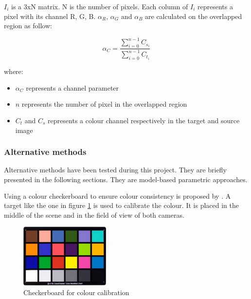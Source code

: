 $I_i$ is a 3xN matrix. N is the number of pixels. Each column of $I_i$ represents a pixel with its channel R, G, B.  $\alpha_{R}$, $\alpha_{G}$ and $\alpha_{B}$ are calculated on the overlapped region as follow:

\begin{equation}
    \alpha_{C} = \dfrac{\sum_{i=0}^{n-1} C_{s_{i}}}{\sum_{i=0}^{n-1} C_{t_{i}}}
    \label{equation:param}
\end{equation}

where:

\begin{itemize}
    \item $\alpha_{C}$ represents a channel parameter
    \item $n$ represents the number of pixel in the overlapped region
    \item $C_{t}$ and $C_{s}$ represents a colour channel respectively in the target and source image 
\end{itemize}

\subsubsection{Alternative methods}

Alternative methods have been tested during this project. They are briefly presented in the following sections. They are model-based parametric approaches.

\label{section:ensuring_checkerboard}

Using a colour checkerboard to ensure colour consistency is proposed by \cite{ilie_ensuring_2005}. A target like the one in figure \ref{figure:colour_checkerboard} is used to calibrate the colour. It is placed in the middle of the scene and in the field of view of both cameras.

\begin{figure}[H]
    \centering
    \includegraphics[width=0.40\textwidth]{images/visual_enhancement/colour/colour_checkerboard.jpg}
    \caption{Checkerboard for colour calibration}
    \label{figure:colour_checkerboard}
\end{figure}


